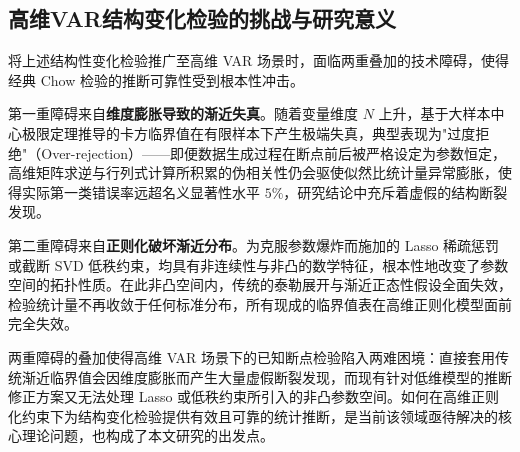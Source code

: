 \subsection{高维VAR结构变化检验的挑战与研究意义}

将上述结构性变化检验推广至高维 VAR 场景时，面临两重叠加的技术障碍，使得经典 Chow 检验的推断可靠性受到根本性冲击。

第一重障碍来自\textbf{维度膨胀导致的渐近失真}。随着变量维度 $N$ 上升，基于大样本中心极限定理推导的卡方临界值在有限样本下产生极端失真，典型表现为"过度拒绝"（Over-rejection）——即便数据生成过程在断点前后被严格设定为参数恒定，高维矩阵求逆与行列式计算所积累的伪相关性仍会驱使似然比统计量异常膨胀，使得实际第一类错误率远超名义显著性水平 $5\%$，研究结论中充斥着虚假的结构断裂发现。

第二重障碍来自\textbf{正则化破坏渐近分布}。为克服参数爆炸而施加的 Lasso 稀疏惩罚或截断 SVD 低秩约束，均具有非连续性与非凸的数学特征，根本性地改变了参数空间的拓扑性质。在此非凸空间内，传统的泰勒展开与渐近正态性假设全面失效，检验统计量不再收敛于任何标准分布，所有现成的临界值表在高维正则化模型面前完全失效。

两重障碍的叠加使得高维 VAR 场景下的已知断点检验陷入两难困境：直接套用传统渐近临界值会因维度膨胀而产生大量虚假断裂发现，而现有针对低维模型的推断修正方案又无法处理 Lasso 或低秩约束所引入的非凸参数空间。如何在高维正则化约束下为结构变化检验提供有效且可靠的统计推断，是当前该领域亟待解决的核心理论问题，也构成了本文研究的出发点。
